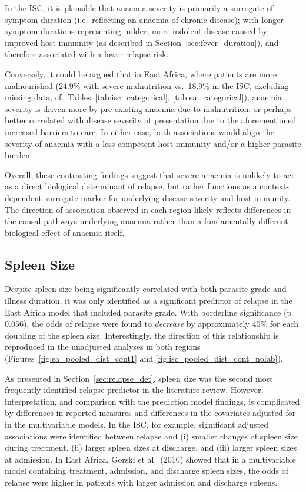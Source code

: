 In the ISC, it is plausible that anaemia severity is primarily a surrogate of symptom duration (i.e.\ reflecting an anaemia of chronic disease); with longer symptom durations representing milder, more indolent disease caused by improved host immunity (as described in Section~\ref{sec:fever_duration}), and therefore associated with a lower relapse risk.

Conversely, it could be argued that in East Africa, where patients are more malnourished (24.9\% with severe malnutrition vs.\ 18.9\% in the ISC, excluding missing data, cf.\ Tables~\ref{tab:isc_categorical}, \ref{tab:ea_categorical}), anaemia severity is driven more by pre-existing anaemia due to malnutrition, or perhaps better correlated with disease severity at presentation due to the aforementioned increased barriers to care. In either case, both associations would align the severity of anaemia with a less competent host immunity and/or a higher parasite burden.

Overall, these contrasting findings suggest that severe anaemia is unlikely to act as a direct biological determinant of relapse, but rather functions as a context-dependent surrogate marker for underlying disease severity and host immunity. The direction of association observed in each region likely reflects differences in the causal pathways underlying anaemia rather than a fundamentally different biological effect of anaemia itself.

\subsection{Spleen Size\label{sec:spleen-size}}

Despite spleen size being significantly correlated with both parasite grade and illness duration, it was only identified as a significant predictor of relapse in the East Africa model that included parasite grade. With borderline significance (p = 0.056), the odds of relapse were found to \textit{decrease} by approximately 40\% for each doubling of the spleen size. Interestingly, the direction of this relationship is reproduced in the unadjusted analyses in both regions (Figures~\ref{fig:ea_pooled_dist_cont1} and \ref{fig:isc_pooled_dist_cont_nolab}).

As presented in Section~\ref{sec:relapse_det}, spleen size was the second most frequently identified relapse predictor in the literature review. However, interpretation, and comparison with the prediction model findings, is complicated by differences in reported measures and differences in the covariates adjusted for in the multivariable models. In the ISC, for example, significant adjusted associations were identified between relapse and (i) smaller changes of spleen size during treatment\cite{burza2014}, (ii) larger spleen sizes at discharge\cite{lucero2015}, and (iii) larger spleen sizes at admission\cite{sundar2019}. In East Africa, Gorski et al.\ (2010) showed that in a multivariable model containing treatment, admission, and discharge spleen sizes, the odds of relapse were higher in patients with larger admission and discharge spleens.

